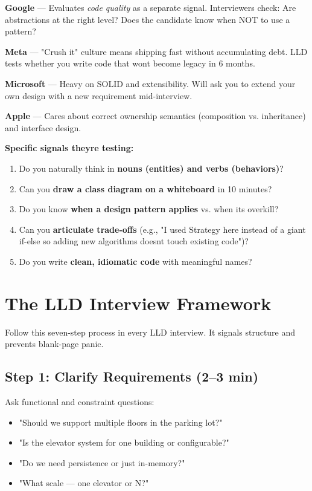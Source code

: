 \documentclass[11pt]{article}
\providecommand{\tightlist}{\setlength{\itemsep}{1pt}\setlength{\parskip}{0pt}}
\begin{document}
\textbf{Google} --- Evaluates \emph{code quality} as a separate signal. Interviewers check: Are abstractions at the right level? Does the candidate know when NOT to use a pattern?

\textbf{Meta} --- "Crush it" culture means shipping fast without accumulating debt. LLD tests whether you write code that won\textquotesingle t become legacy in 6 months.

\textbf{Microsoft} --- Heavy on SOLID and extensibility. Will ask you to extend your own design with a new requirement mid-interview.

\textbf{Apple} --- Cares about correct ownership semantics (composition vs. inheritance) and interface design.

\textbf{Specific signals they\textquotesingle re testing:}

\begin{enumerate}
\def\labelenumi{\arabic{enumi}.}
\tightlist
\item
  Do you naturally think in \textbf{nouns (entities) and verbs (behaviors)}?
\item
  Can you \textbf{draw a class diagram on a whiteboard} in 10 minutes?
\item
  Do you know \textbf{when a design pattern applies} vs. when it\textquotesingle s overkill?
\item
  Can you \textbf{articulate trade-offs} (e.g., "I used Strategy here instead of a giant if-else so adding new algorithms doesn\textquotesingle t touch existing code")?
\item
  Do you write \textbf{clean, idiomatic code} with meaningful names?
\end{enumerate}

\section{The LLD Interview Framework}\label{the-lld-interview-framework}

Follow this seven-step process in every LLD interview. It signals structure and prevents blank-page panic.

\subsection{Step 1: Clarify Requirements (2--3 min)}\label{step-1-clarify-requirements-23-min}

Ask functional and constraint questions:

\begin{itemize}
\tightlist
\item
  "Should we support multiple floors in the parking lot?"
\item
  "Is the elevator system for one building or configurable?"
\item
  "Do we need persistence or just in-memory?"
\item
  "What scale --- one elevator or N?"
\end{itemize}
\end{document}
